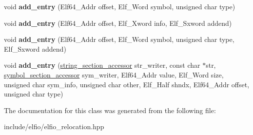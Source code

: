 \begin{DoxyCompactItemize}
\item 
void {\bfseries add\+\_\+entry} (Elf64\+\_\+\+Addr offset, Elf\+\_\+\+Word symbol, unsigned char type)\hypertarget{class_e_l_f_i_o_1_1relocation__section__accessor_ab2bf5c541c631c072e41db878379cdb4}{}\label{class_e_l_f_i_o_1_1relocation__section__accessor_ab2bf5c541c631c072e41db878379cdb4}

\item 
void {\bfseries add\+\_\+entry} (Elf64\+\_\+\+Addr offset, Elf\+\_\+\+Xword info, Elf\+\_\+\+Sxword addend)\hypertarget{class_e_l_f_i_o_1_1relocation__section__accessor_ac1da3c815494de4e5e81bdfcc3213430}{}\label{class_e_l_f_i_o_1_1relocation__section__accessor_ac1da3c815494de4e5e81bdfcc3213430}

\item 
void {\bfseries add\+\_\+entry} (Elf64\+\_\+\+Addr offset, Elf\+\_\+\+Word symbol, unsigned char type, Elf\+\_\+\+Sxword addend)\hypertarget{class_e_l_f_i_o_1_1relocation__section__accessor_a7a7e37f0e23555a2d789b05d778fea3b}{}\label{class_e_l_f_i_o_1_1relocation__section__accessor_a7a7e37f0e23555a2d789b05d778fea3b}

\item 
void {\bfseries add\+\_\+entry} (\hyperlink{class_e_l_f_i_o_1_1string__section__accessor}{string\+\_\+section\+\_\+accessor} str\+\_\+writer, const char $\ast$str, \hyperlink{class_e_l_f_i_o_1_1symbol__section__accessor}{symbol\+\_\+section\+\_\+accessor} sym\+\_\+writer, Elf64\+\_\+\+Addr value, Elf\+\_\+\+Word size, unsigned char sym\+\_\+info, unsigned char other, Elf\+\_\+\+Half shndx, Elf64\+\_\+\+Addr offset, unsigned char type)\hypertarget{class_e_l_f_i_o_1_1relocation__section__accessor_a28378f46b0a5fcf3aa17f229bd9b3cdd}{}\label{class_e_l_f_i_o_1_1relocation__section__accessor_a28378f46b0a5fcf3aa17f229bd9b3cdd}

\end{DoxyCompactItemize}


The documentation for this class was generated from the following file\+:\begin{DoxyCompactItemize}
\item 
include/elfio/elfio\+\_\+relocation.\+hpp\end{DoxyCompactItemize}
